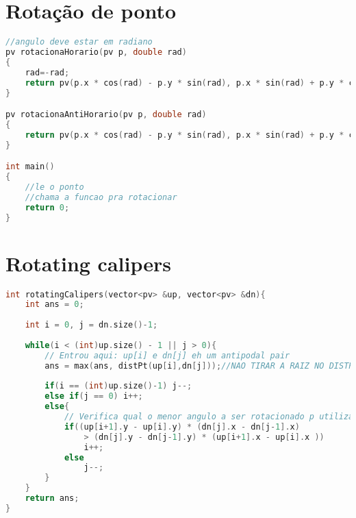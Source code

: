 \documentclass[12pt,a4paper, twoside]{report}
\begin{document}
\section{Rotação de ponto}
\noindent\begin{lstlisting}[caption=Rotação de ponto,language=C++]
//angulo deve estar em radiano
pv rotacionaHorario(pv p, double rad)
{
    rad=-rad;
    return pv(p.x * cos(rad) - p.y * sin(rad), p.x * sin(rad) + p.y * cos(rad));
}

pv rotacionaAntiHorario(pv p, double rad)
{
    return pv(p.x * cos(rad) - p.y * sin(rad), p.x * sin(rad) + p.y * cos(rad));
}

int main()
{
    //le o ponto
    //chama a funcao pra rotacionar
    return 0;
}
\end{lstlisting}

\section{Rotating calipers}
\noindent\begin{lstlisting}[caption=Rotating calipers,language=C++]
int rotatingCalipers(vector<pv> &up, vector<pv> &dn){
    int ans = 0;
    
    int i = 0, j = dn.size()-1; 
    
    while(i < (int)up.size() - 1 || j > 0){
        // Entrou aqui: up[i] e dn[j] eh um antipodal pair
        ans = max(ans, distPt(up[i],dn[j]));//NAO TIRAR A RAIZ NO DISTPT PARA EVITAR PRECISAO
        
        if(i == (int)up.size()-1) j--;
        else if(j == 0) i++;
        else{
            // Verifica qual o menor angulo a ser rotacionado p utilizar na rotacao
            if((up[i+1].y - up[i].y) * (dn[j].x - dn[j-1].x)
                > (dn[j].y - dn[j-1].y) * (up[i+1].x - up[i].x ))
                i++;
            else
                j--;
        }
    }
    return ans;
}

\end{lstlisting}
\end{document}
